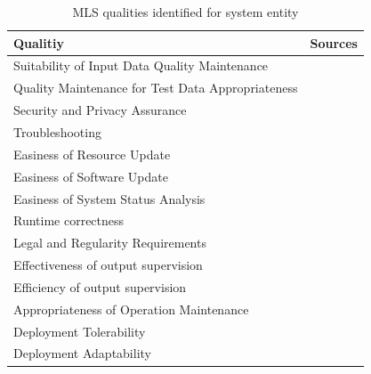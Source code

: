 \begin{table}[h]\label{tb:LiteratureQualitiesSystem}
    \centering\footnotesize
    \begin{tabular}{p{} p{}}
        \textbf{Qualitiy} & \textbf{Sources} \\
        \toprule
        Suitability of Input Data Quality Maintenance &~\cite{nakamichi_requirements-driven_2020} \\
        Quality Maintenance for Test Data Appropriateness&~\cite{nakamichi_requirements-driven_2020}\\
        Security and Privacy Assurance&~\cite{nakamichi_requirements-driven_2020,zhang_machine_2020}\\
        Troubleshooting &~\cite{arpteg_software_2018} \\
        Easiness of Resource Update &~\cite{nakamichi_requirements-driven_2020} \\
        Easiness of Software Update &~\cite{nakamichi_requirements-driven_2020} \\
        Easiness of System Status Analysis &~\cite{nakamichi_requirements-driven_2020} \\
        Runtime correctness &~\cite{siebert_construction_2021} \\
        Legal and Regularity Requirements &~\cite{vogelsang_requirements_2019} \\
        Effectiveness of output supervision &~\cite{siebert_construction_2021} \\
        Efficiency of output supervision &~\cite{siebert_construction_2021} \\
        Appropriateness of Operation Maintenance &~\cite{nakamichi_requirements-driven_2020} \\
        Deployment Tolerability &~\cite{ashmore_assuring_2021} \\
        Deployment Adaptability &~\cite{ashmore_assuring_2021} \\
    \end{tabular}
    \caption{MLS qualities identified for system entity}
\end{table}
